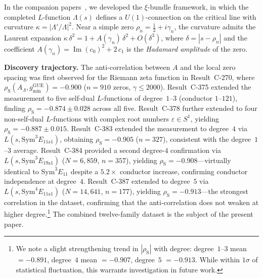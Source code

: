 \documentclass[11pt, a4paper]{article}
\theoremstyle{plain}
\theoremstyle{definition}
\newcommand{\Lam}{\Lambda}
\newcommand{\kap}{\kappa}
\DeclareMathOperator{\GUE}{GUE}
\begin{document}
In the companion papers~\cite{paper1,paper2,paper3}, we developed
the $\xi$-bundle framework, in which the completed $L$-function
$\Lam(s)$ defines a $U(1)$-connection on the critical line with
curvature $\kap = |\Lam'/\Lam|^2$.
Near a simple zero $\rho_n = \tfrac{1}{2} + i\gamma_n$, the
curvature admits the Laurent expansion
$\kap\,\delta^2 = 1 + A(\gamma_n)\,\delta^2 + O(\delta^3)$,
where $\delta = |s - \rho_n|$ and the coefficient
$A(\gamma_n) = \operatorname{Im}(c_0)^2 + 2\,c_1$ is the
\emph{Hadamard amplitude} of the zero.

\medskip\noindent\textbf{Discovery trajectory.}\;
The anti-correlation between $A$ and the local zero spacing was
first observed for the Riemann zeta function in
Result~C-270, where $\rho_{\mathrm{S}}(A_\Lam, g_{\min}^{\GUE})
= -0.900$ ($n = 910$ zeros, $\gamma \le 2000$).
Result~C-375 extended the measurement to five self-dual
$L$-functions of degree~$1$--$3$ (conductor $1$--$121$),
finding $\rho_{\mathrm{S}} = -0.874 \pm 0.028$ across all five.
Result~C-378 further extended to four non-self-dual $L$-functions
with complex root numbers $\varepsilon \in S^1$, yielding
$\rho_{\mathrm{S}} = -0.887 \pm 0.015$.
Result~C-383 extended the measurement to degree~$4$ via
$L(s, \mathrm{Sym}^3 E_{11\mathrm{a}1})$, obtaining
$\rho_{\mathrm{S}} = -0.905$ ($n = 327$), consistent with the
degree~$1$--$3$ average.
Result~C-384 provided a second degree-$4$ confirmation via
$L(s, \mathrm{Sym}^3 E_{19\mathrm{a}1})$ ($N = 6{,}859$,
$n = 357$), yielding $\rho_{\mathrm{S}} = -0.908$---virtually
identical to $\mathrm{Sym}^3 E_{11}$ despite a $5.2\times$
conductor increase, confirming conductor independence at
degree~$4$.
Result~C-387 extended to degree~$5$ via
$L(s, \mathrm{Sym}^4 E_{11\mathrm{a}1})$ ($N = 14{,}641$,
$n = 177$), yielding $\rho_{\mathrm{S}} = -0.913$---the
strongest correlation in the dataset, confirming that the
anti-correlation does not weaken at higher degree.\footnote{%
We note a slight strengthening trend in $|\rho_{\mathrm{S}}|$
with degree: degree~$1$--$3$ mean $= -0.891$, degree~$4$
mean $= -0.907$, degree~$5$ $= -0.913$.  While within $1\sigma$
of statistical fluctuation, this warrants investigation in
future work.}
The combined twelve-family dataset is the subject of the present
paper.
\end{document}
